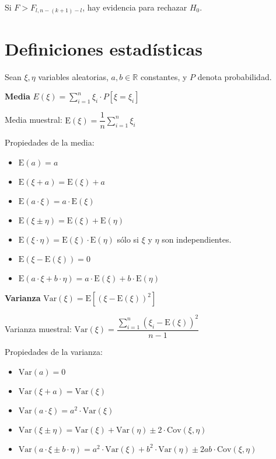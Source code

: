 \documentclass[10pt, a4paper, landscape]{article}
\newcommand{\E}{\mathrm{E}}
\newcommand{\Var}{\mathrm{Var}}
\newcommand{\Cov}{\mathrm{Cov}}
\begin{document}
\begin{multicols}{3}
		Si $F > F_{l, n - (k + 1) - l}$, hay evidencia para rechazar $H_{0}$.
		
		\section*{Definiciones estadísticas}
		
		Sean $\xi, \eta$ variables aleatorias, $a, b \in \mathbb{R}$ constantes, y $P$ denota probabilidad.
		
		\textbf{Media} \quad $E(\xi) = \sum_{i=1}^{n}\xi_{i} \cdot P[\xi = \xi_{i}]$
		
		Media muestral: \quad $\E(\xi) = \dfrac{1}{n}\sum_{i=1}^{n}\xi_{i}$
		
		Propiedades de la media:
		
		\begin{itemize}[leftmargin=*]
			\item $\E(a) = a$
			\item $\E(\xi + a) = \E(\xi) + a$
			\item $\E(a \cdot \xi) = a \cdot \E(\xi)$
			\item $\E(\xi \pm \eta) = \E(\xi) + \E(\eta)$
			\item $\E(\xi \cdot \eta) = \E(\xi) \cdot \E(\eta)$ \quad sólo si $\xi$ y $\eta$ son independientes.
			\item $\E(\xi - \E(\xi)) = 0$
			\item $\E(a \cdot \xi + b \cdot \eta) = a \cdot \E(\xi) + b \cdot \E(\eta)$
		\end{itemize}
		
		\textbf{Varianza} \quad $\Var(\xi) = \E[(\xi - \E(\xi))^{2}]$
		
		Varianza muestral: \quad $\Var(\xi) = \dfrac{\sum_{i=1}^{n} (\xi_{i} - \E(\xi))^2}{n - 1}$
		
		Propiedades de la varianza:
		
		\begin{itemize}[leftmargin=*]
			\item $\Var(a) = 0$
			\item $\Var(\xi + a) = \Var(\xi)$
			\item $\Var(a \cdot \xi) = a^{2} \cdot \Var(\xi)$
			\item $\Var(\xi \pm \eta) = \Var(\xi) + \Var(\eta) \pm 2 \cdot \Cov(\xi, \eta)$
			\item $\Var(a \cdot \xi \pm b \cdot \eta) = a^{2} \cdot \Var(\xi) + b^{2} \cdot \Var(\eta) \pm 2 a b \cdot \Cov(\xi, \eta)$
		\end{itemize}
		

\end{multicols}
\end{document}
